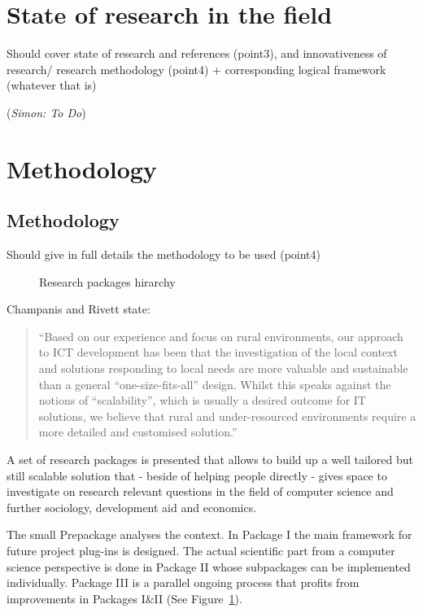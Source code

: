 \documentclass[11pt]{article}
\newcommand{\simon}[1]{\vspace{1em}(\emph{Simon: #1})\vspace{1em}}
\begin{document}
\section{State of research in the field}\label{state_of_research}
Should cover state of research and references (point3), and innovativeness of research/ research methodology (point4) + corresponding logical framework (whatever that is)

\simon{To Do}

\section{Methodology}\label{methodology}
\subsection{Methodology}\label{metho}
Should give in full details the methodology to be used (point4)

\begin{figure}
\begin{center}
 
\end{center}
\caption{Research packages hirarchy}
\label{tikz:researchpackages}
\end{figure} 

Champanis and Rivett \cite{champanis2012reporting} state: \begin{quote}
``Based on our experience and focus on rural environments, our
approach to ICT development has been that the investigation of
the local context and solutions responding to local needs are more
valuable and sustainable than a general “one-size-fits-all” design.
Whilst this speaks against the notions of “scalability”, which is
usually a desired outcome for IT solutions, we believe that rural
and under-resourced environments require a more detailed and
customised solution.''\end{quote} 

A set of research packages is presented that allows to build up a well tailored but still scalable solution that - beside of helping people directly -  gives space to investigate on research relevant questions in the field of computer science and further sociology, development aid and economics. 

The small Prepackage analyses the context. In Package I the main framework for future project plug-ins is designed. The actual scientific part from a computer science perspective is done in Package II whose subpackages can be implemented individually. Package III is a parallel ongoing process that profits from improvements in Packages I\&II (See Figure~\ref{tikz:researchpackages}).
\end{document}
